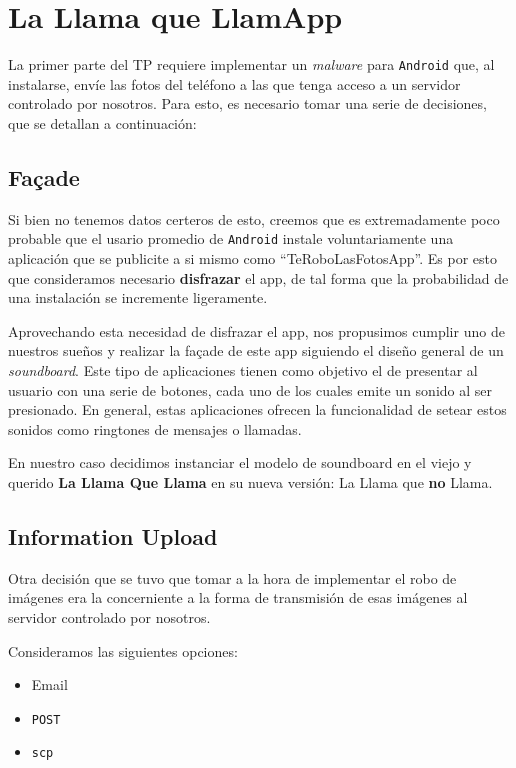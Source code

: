 \section{La Llama que LlamApp} %

La primer parte del TP requiere implementar un \emph{malware} para \texttt{Android} que, al instalarse, envíe las fotos del teléfono a las que tenga acceso a un servidor controlado por nosotros. Para esto, es necesario tomar una serie de decisiones, que se detallan a continuación:

\subsection{Façade} %
\label{sub:fa_ade}
Si bien no tenemos datos certeros de esto, creemos que es extremadamente poco probable que el usario promedio de \texttt{Android} instale voluntariamente una aplicación que se publicite a si mismo como ``TeRoboLasFotosApp''. Es por esto que consideramos necesario \textbf{disfrazar} el app, de tal forma que la probabilidad de una instalación se incremente ligeramente. 

Aprovechando esta necesidad de disfrazar el app, nos propusimos cumplir uno de nuestros sueños y realizar la façade de este app siguiendo el diseño general de un \textit{soundboard}. Este tipo de aplicaciones tienen como objetivo el de presentar al usuario con una serie de botones, cada uno de los cuales emite un sonido al ser presionado. En general, estas aplicaciones ofrecen la funcionalidad de setear estos sonidos como ringtones de mensajes o llamadas.

En nuestro caso decidimos instanciar el modelo de soundboard en el viejo y querido \textbf{La Llama Que Llama} en su nueva versión: La Llama que \textbf{no} Llama.

\subsection{Information Upload} %
\label{sub:Information Upload}
Otra decisión que se tuvo que tomar a la hora de implementar el robo de imágenes era la concerniente a la forma de transmisión de esas imágenes al servidor controlado por nosotros. 

Consideramos las siguientes opciones:
\begin{itemize}
	\item Email
	\item \texttt{POST}
	\item \texttt{scp}
\end{itemize}


